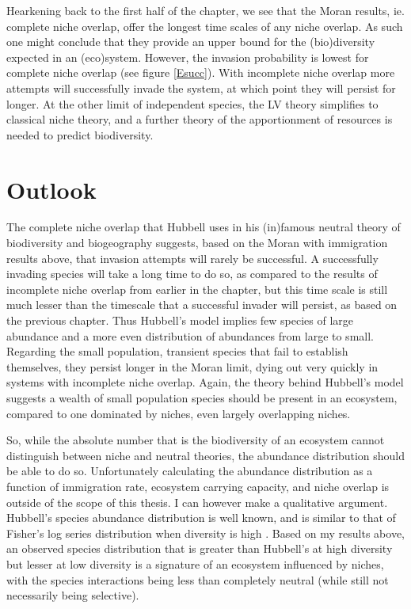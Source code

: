 
Hearkening back to the first half of the chapter, we see that the Moran results, ie. complete niche overlap, offer the longest time scales of any niche overlap. 
As such one might conclude that they provide an upper bound for the (bio)diversity expected in an (eco)system. 
However, the invasion probability is lowest for complete niche overlap (see figure \ref{Esucc}). 
With incomplete niche overlap more attempts will successfully invade the system, at which point they will persist for longer. 
At the other limit of independent species, the LV theory simplifies to classical niche theory, and a further theory of the apportionment of resources is needed to predict biodiversity. 


\section{Outlook}%
The complete niche overlap that Hubbell uses in his (in)famous neutral theory of biodiversity and biogeography suggests, based on the Moran with immigration results above, that invasion attempts will rarely be successful. 
A successfully invading species will take a long time to do so, as compared to the results of incomplete niche overlap from earlier in the chapter, but this time scale is still much lesser than the timescale that a successful invader will persist, as based on the previous chapter. 
Thus Hubbell's model implies few species of large abundance and a more even distribution of abundances from large to small. 
Regarding the small population, transient species that fail to establish themselves, they persist longer in the Moran limit, dying out very quickly in systems with incomplete niche overlap. 
Again, the theory behind Hubbell's model suggests a wealth of small population species should be present in an ecosystem, compared to one dominated by niches, even largely overlapping niches. 

So, while the absolute number that is the biodiversity of an ecosystem cannot distinguish between niche and neutral theories, the abundance distribution should be able to do so. 
Unfortunately calculating the abundance distribution as a function of immigration rate, ecosystem carrying capacity, and niche overlap is outside of the scope of this thesis. 
I can however make a qualitative argument. 
Hubbell's species abundance distribution is well known, and is similar to that of Fisher's log series distribution when diversity is high \cite{Fisher1943,Alonso2004}. 
Based on my results above, an observed species distribution that is greater than Hubbell's at high diversity but lesser at low diversity is a signature of an ecosystem influenced by niches, with the species interactions being less than completely neutral (while still not necessarily being selective). %

